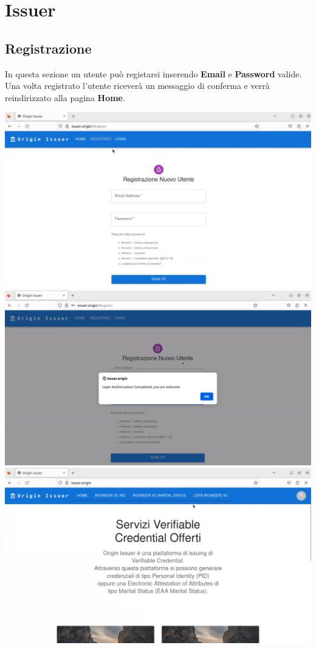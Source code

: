 \section{Issuer}

\subsection{Registrazione}
In questa sezione un utente può registarsi inserendo \textbf{Email} e \textbf{Password} valide. Una volta registrato l'utente riceverà un messaggio di conferma e verrà reindirizzato alla pagina \textbf{Home}.
\begin{center}
\includegraphics[scale = 0.2]{./res/img/issuer/new/registrazione.png}
\includegraphics[scale = 0.2]{./res/img/issuer/new/registrazione2.png}
\includegraphics[scale = 0.2]{./res/img/issuer/new/registrazione3.png}
\end{center}

